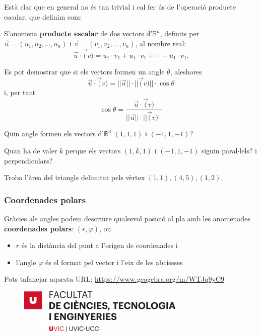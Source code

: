 \documentclass{beamer}
\begin{document}
\begin{frame}
  Està clar que en general no és tan trivial i cal fer ús de l'operació producte escalar, que definim com:
  \begin{definicio}
    S'anomena {\bf producte escalar} de dos vectors d'$\mathbb{R}^n$, definits per $\vec{u}=(u_1,u_2,\ldots,u_n)$ i $\vec{v}=(v_1,v_2,\ldots,v_n)$, al nombre real:
    \[
    \vec{u}\cdot \vec(v)= u_1\cdot v_1+u_1\cdot v_1+\cdots+u_1\cdot v_1.
    \]
  \end{definicio}
  Es pot demostrar que si els vectors formen un angle $\theta$, aleshores
  \[
  \vec{u}\cdot \vec(v)=||\vec{u}||\cdot ||\vec(v)|| \cdot \cos{\theta}
  \]
  i, per tant
  \[\cos{\theta}=\frac{\vec{u}\cdot \vec(v)}{||\vec{u}||\cdot ||\vec(v)||}
  \]
\end{frame}
\begin{frame}
  \begin{exercise}{}{}
    Quin angle formen els vectors d'$\mathbb{R}^3$ $(1,1,1)$ i $(-1,1,-1)$?
  \end{exercise}

  \begin{exercise}{}
    Quan ha de valer $k$ perque els vectors $(1,k,1)$ i $(-1,1,-1)$ siguin paral$\cdot$lels? i perpendiculars?
  \end{exercise}

  \begin{exercise}{}{}
    Troba l'àrea del triangle delimitat pels vèrtex $(1,1),(4,5),(1,2)$.
  \end{exercise}
\end{frame}
\begin{frame}
  \frametitle{Coordenades polars}
  Gràcies als angles podem descriure qualsevol posició al pla amb les anomenades {\bf coordenades polars}: $(r,\varphi)$, on
  \begin{itemize}
    \item $r$ és la distància del punt a l'origen de coordenades i
    \item l'angle $\varphi$ és el format pel vector i l'eix de les abcissses
  \end{itemize}
  Pots tafanejar aquesta URL: \url{https://www.geogebra.org/m/WTJq9yC9}
  \begin{figure}
    \includegraphics[width=0.35\linewidth]{FCTE}
  \end{figure}

\end{frame}
\end{document}
